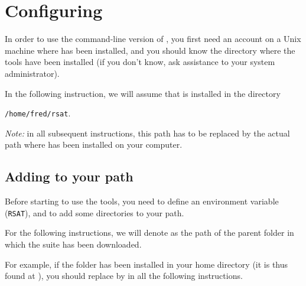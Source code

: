 \section{Configuring \RSAT}


In order to use the command-line version of \RSAT, you first need an
account on a Unix machine where \RSAT has been installed, and you
should know the directory where the tools have been installed (if you
don't know, ask assistance to your system administrator).

In the following instruction, we will assume that \RSAT is installed
in the directory 

\texttt{/home/fred/rsat}. 

\emph{Note:} in all subsequent instructions, this path has to be
replaced by the actual path where \RSAT has been installed on your
computer.

\subsection{Adding \RSAT  to your path}

Before starting to use the tools, you need to define an environment
variable (\texttt{RSAT}), and to add some directories to your path.

For the following instructions, we will denote as 
the path of the parent folder in which the \RSAT suite has been
downloaded.

For example, if the  folder has been installed in your
home directory (it is thus found at ), you
should replace  by  in all the
following instructions. 


